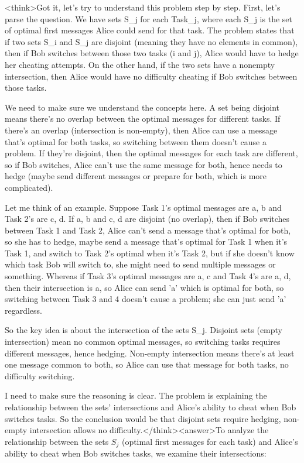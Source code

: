 <think>Got it, let's try to understand this problem step by step. First, let's parse the question. We have sets S_j for each Task_j, where each S_j is the set of optimal first messages Alice could send for that task. The problem states that if two sets S_i and S_j are disjoint (meaning they have no elements in common), then if Bob switches between those two tasks (i and j), Alice would have to hedge her cheating attempts. On the other hand, if the two sets have a nonempty intersection, then Alice would have no difficulty cheating if Bob switches between those tasks.

We need to make sure we understand the concepts here. A set being disjoint means there's no overlap between the optimal messages for different tasks. If there's an overlap (intersection is non-empty), then Alice can use a message that's optimal for both tasks, so switching between them doesn't cause a problem. If they're disjoint, then the optimal messages for each task are different, so if Bob switches, Alice can't use the same message for both, hence needs to hedge (maybe send different messages or prepare for both, which is more complicated).

Let me think of an example. Suppose Task 1's optimal messages are {a, b} and Task 2's are {c, d}. If {a, b} and {c, d} are disjoint (no overlap), then if Bob switches between Task 1 and Task 2, Alice can't send a message that's optimal for both, so she has to hedge, maybe send a message that's optimal for Task 1 when it's Task 1, and switch to Task 2's optimal when it's Task 2, but if she doesn't know which task Bob will switch to, she might need to send multiple messages or something. Whereas if Task 3's optimal messages are {a, c} and Task 4's are {a, d}, then their intersection is {a}, so Alice can send 'a' which is optimal for both, so switching between Task 3 and 4 doesn't cause a problem; she can just send 'a' regardless.

So the key idea is about the intersection of the sets S_j. Disjoint sets (empty intersection) mean no common optimal messages, so switching tasks requires different messages, hence hedging. Non-empty intersection means there's at least one message common to both, so Alice can use that message for both tasks, no difficulty switching.

I need to make sure the reasoning is clear. The problem is explaining the relationship between the sets' intersections and Alice's ability to cheat when Bob switches tasks. So the conclusion would be that disjoint sets require hedging, non-empty intersection allows no difficulty.</think><answer>To analyze the relationship between the sets \( S_j \) (optimal first messages for each task) and Alice's ability to cheat when Bob switches tasks, we examine their intersections:  

